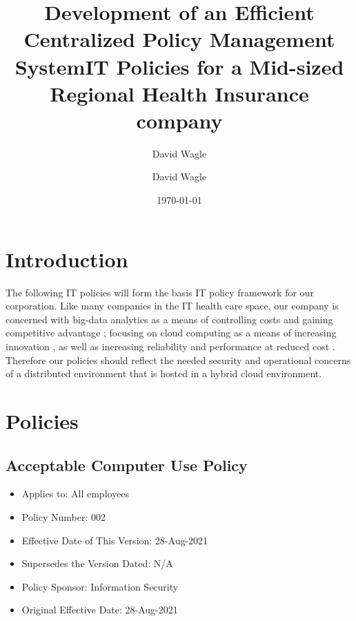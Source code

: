 \documentclass[stu]{apa7}
\title{Development of an Efficient Centralized Policy Management System}
\author{David Wagle}
\affiliation{School of Business, Northcentral University}
\author{David Wagle}
\date{\today}
\title{IT Policies for a Mid-sized Regional Health Insurance company}
\begin{document}
\maketitle
\maketitle

\section{Introduction}
\label{sec:orgbd96d16}

The following IT policies will form the basis IT policy framework for our corporation. Like many companies in the IT health care space, our company is concerned with big-data analytics as a means of controlling costs and gaining competitive advantage \citep{milenkovicBigDataAnalytics2019,dolezelBigDataAnalytics2019}; focusing on cloud computing as a means of increasing innovation \citep{linCloudComputingInnovation2012,mallmannAdoptionCloudComputing2018,karunagaranDifferentialCloudAdoption2019}, as well as increasing reliability and performance at reduced cost \citep{andradePerformabilityEvaluationCloudBased2019,khayerCloudComputingAdoption2020}. Therefore our policies should reflect the needed security and operational concerns of a distributed environment that is hosted in a hybrid cloud environment.

\section{Policies}
\label{sec:orgee837a6}

\subsection{Acceptable Computer Use Policy}
\label{sec:org9821602}

\begin{itemize}
\item Applies to: All employees
\item Policy Number: 002
\item Effective Date of This Version: 28-Aug-2021
\item Supersedes the Version Dated: N/A
\item Policy Sponsor: Information Security
\item Original Effective Date: 28-Aug-2021
\end{itemize}
\end{document}
